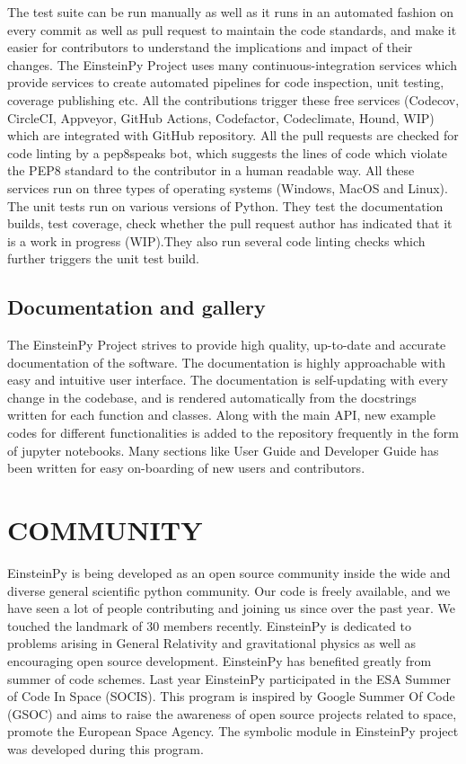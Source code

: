 \documentclass{aastex63}
\begin{document}
The test suite can be run manually as well as it runs in an automated fashion on every commit as well as pull request to maintain the code standards, and make it easier for contributors to understand the implications and impact of their changes. The EinsteinPy Project uses many continuous-integration services which provide services to create automated pipelines for code inspection, unit testing, coverage publishing etc. All the contributions trigger these free services (Codecov, CircleCI, Appveyor, GitHub Actions, Codefactor, Codeclimate, Hound, WIP) which are integrated with GitHub repository. All the pull requests are checked for code linting by a pep8speaks bot, which suggests the lines of code which violate the PEP8 standard to the contributor in a human readable way. All these services run on three types of operating systems (Windows, MacOS and Linux). The unit tests run on various versions of Python. They test the documentation builds, test coverage, check whether the pull request author has indicated that it is a work in progress (WIP).They also run several code linting checks which further triggers the unit test build.

\subsection{ Documentation and gallery} \label{subsec:doc}
The EinsteinPy Project strives to provide high quality, up-to-date and accurate documentation of the software. The documentation is highly approachable with easy and intuitive user interface. The documentation is self-updating with every change in the codebase, and is rendered automatically from the docstrings written for each function and classes. Along with the main API, new example codes for different functionalities is added to the repository frequently in the form of jupyter notebooks. Many sections like User Guide and Developer Guide has been written for easy on-boarding of new users and contributors.
	
\section{COMMUNITY} \label{sec:COMMUNITY}
EinsteinPy is being developed as an open source community inside the wide and diverse general scientific python community. Our code is freely available, and we have seen a lot of people contributing and joining us since over the past year.
We touched the landmark of 30 members recently. EinsteinPy is dedicated to problems arising in General Relativity and gravitational physics as well as encouraging open source development. EinsteinPy has benefited greatly from summer of code schemes. Last year EinsteinPy participated in the ESA Summer of Code In Space (SOCIS). This program is inspired by Google Summer Of Code (GSOC) and aims to raise the awareness of open source projects related to space, promote the European Space Agency. The symbolic module in EinsteinPy project was developed during this program.
\end{document}
